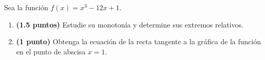 
Sea la función $f(x)=x^3-12x+1$.
\begin{enumerate}[label=\alph*)]
\item \textbf{(1.5 puntos)} Estudie su monotonía y determine sus extremos relativos.
\item \textbf{(1 punto)} Obtenga la ecuación de la recta tangente a la gráfica de la función en el punto de abscisa $x=1$.
\end{enumerate}
